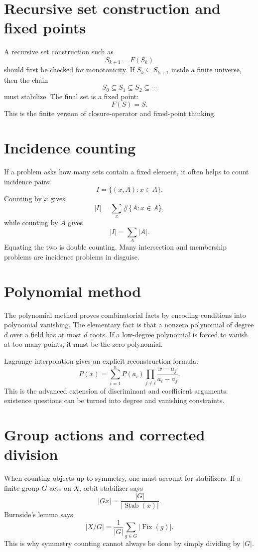 \section{Recursive set construction and fixed points}

A recursive set construction such as
\[
  S_{k+1}=F(S_k)
\]
should first be checked for monotonicity.  If \(S_k\subseteq S_{k+1}\) inside a finite universe, then the chain
\[
  S_0\subseteq S_1\subseteq S_2\subseteq\cdots
\]
must stabilize.  The final set is a fixed point:
\[
  F(S)=S.
\]
This is the finite version of closure-operator and fixed-point thinking.

\section{Incidence counting}

If a problem asks how many sets contain a fixed element, it often helps to count incidence pairs:
\[
  I=\{(x,A):x\in A\}.
\]
Counting by \(x\) gives
\[
  |I|=\sum_x \#\{A:x\in A\},
\]
while counting by \(A\) gives
\[
  |I|=\sum_A |A|.
\]
Equating the two is double counting.  Many intersection and membership problems are incidence problems in disguise.

\section{Polynomial method}

The polynomial method proves combinatorial facts by encoding conditions into polynomial vanishing.  The elementary fact is that a nonzero polynomial of degree \(d\) over a field has at most \(d\) roots.  If a low-degree polynomial is forced to vanish at too many points, it must be the zero polynomial.

Lagrange interpolation gives an explicit reconstruction formula:
\[
  P(x)=\sum_{i=1}^n P(a_i)\prod_{j\ne i}\frac{x-a_j}{a_i-a_j}.
\]
This is the advanced extension of discriminant and coefficient arguments: existence questions can be turned into degree and vanishing constraints.

\section{Group actions and corrected division}

When counting objects up to symmetry, one must account for stabilizers.  If a finite group \(G\) acts on \(X\), orbit-stabilizer says
\[
  |Gx|=\frac{|G|}{|\operatorname{Stab}(x)|}.
\]
Burnside's lemma says
\[
  |X/G|=\frac1{|G|}\sum_{g\in G}|\operatorname{Fix}(g)|.
\]
This is why symmetry counting cannot always be done by simply dividing by \(|G|\).

